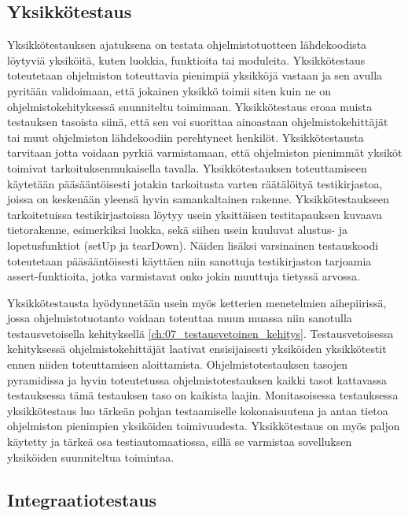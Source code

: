   \subsection{Yksikkötestaus} \label{ch:07_yksikkotestaus}

    Yksikkötestauksen ajatuksena on testata ohjelmistotuotteen lähdekoodista löytyviä yksiköitä, kuten luokkia, funktioita tai moduleita.
    Yksikkötestaus toteutetaan ohjelmiston toteuttavia pienimpiä yksikköjä vastaan ja sen avulla pyritään validoimaan, että jokainen yksikkö toimii siten kuin ne on ohjelmistokehityksessä suunniteltu toimimaan.
    Yksikkötestaus eroaa muista testauksen tasoista siinä, että sen voi suorittaa ainoastaan ohjelmistokehittäjät tai muut ohjelmiston lähdekoodiin perehtyneet henkilöt.
    Yksikkötestausta tarvitaan jotta voidaan pyrkiä varmistamaan, että ohjelmiston pienimmät yksiköt toimivat tarkoituksenmukaisella tavalla.
    Yksikkötestauksen toteuttamiseen käytetään pääsääntöisesti jotakin tarkoitusta varten räätälöityä testikirjastoa, joissa on keskenään yleensä hyvin samankaltainen rakenne.
    Yksikkötestaukseen tarkoitetuissa testikirjastoissa löytyy usein yksittäisen testitapauksen kuvaava tietorakenne, esimerkiksi luokka, sekä siihen usein kuuluvat alustus- ja lopetusfunktiot (setUp ja tearDown).
    Näiden lisäksi varsinainen testauskoodi toteutetaan pääsääntöisesti käyttäen niin sanottuja testikirjaston tarjoamia assert-funktioita, jotka varmistavat onko jokin muuttuja tietyssä arvossa.

    Yksikkötestausta hyödynnetään usein myös ketterien menetelmien aihepiirissä, jossa ohjelmistotuotanto voidaan toteuttaa muun muassa niin sanotulla testausvetoisella kehityksellä \ref{ch:07_testausvetoinen_kehitys}.
    Testausvetoisessa kehityksessä ohjelmistokehittäjät laativat ensisijaisesti yksiköiden yksikkötestit ennen niiden toteuttamisen aloittamista.
    Ohjelmistotestauksen tasojen pyramidissa ja hyvin toteutetussa ohjelmistotestauksen kaikki tasot kattavassa testauksessa tämä testauksen taso on kaikista laajin.
    Monitasoisessa testauksessa yksikkötestaus luo tärkeän pohjan testaamiselle kokonaisuutena ja antaa tietoa ohjelmiston pienimpien yksiköiden toimivuudesta.
    Yksikkötestaus on myös paljon käytetty ja tärkeä osa testiautomaatiossa, sillä se varmistaa sovelluksen yksiköiden suunniteltua toimintaa.

  \subsection{Integraatiotestaus} \label{ch:07_integraatiotestaus}

